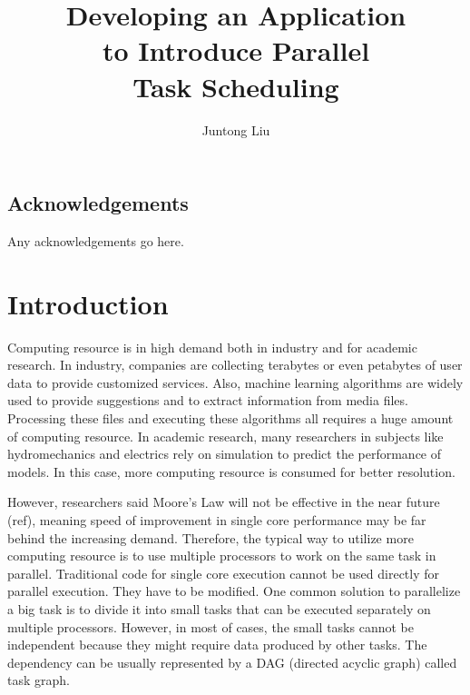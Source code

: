 \documentclass[msc,deptreport, cs]{infthesis}
\begin{document}
\begin{preliminary}

\title{Developing an Application \\to Introduce Parallel \\Task Scheduling}

\author{Juntong Liu}

\abstract{
}

\maketitle

\section*{Acknowledgements}
Any acknowledgements go here. 

\tableofcontents
\end{preliminary}


\chapter{Introduction}

Computing resource is in high demand both in industry and for academic research. In industry, companies are collecting terabytes or even petabytes of user data to provide customized services. Also, machine learning algorithms are widely used to provide suggestions and to extract information from media files. Processing these files and executing these algorithms all requires a huge amount of computing resource. In academic research, many researchers in subjects like hydromechanics and electrics rely on simulation to predict the performance of models. In this case, more computing resource is consumed for better resolution.

However, researchers said Moore's Law will not be effective in the near future (ref), meaning speed of improvement in single core performance may be far behind the increasing demand. Therefore, the typical way to utilize more computing resource is to use multiple processors to work on the same task in parallel. Traditional code for single core execution cannot be used directly for parallel execution. They have to be modified. One common solution to parallelize a big task is to divide it into small tasks that can be executed separately on multiple processors. However, in most of cases, the small tasks cannot be independent because they might require data produced by other tasks. The dependency can be usually represented by a DAG (directed acyclic graph) called task graph.
\end{document}
